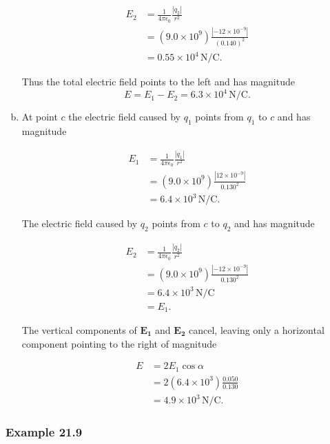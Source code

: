 \documentclass{article}
\begin{document}
\begin{enumerate}[a)]
        \begin{align*}
          E_2 & = \frac{1}{4\pi\epsilon_0} \frac{|q_2|}{r^2}               \\
              & = (9.0 \times 10^9) \frac{|-12 \times 10^{-9}|}{(0.140)^2} \\
              & = 0.55 \times 10^4\,\textrm{N}/\textrm{C}.
        \end{align*}

        Thus the total electric field points to the left and has magnitude \[E = E_1 - E_2 = 6.3 \times 10^4\,\textrm{N}/\textrm{C}.\]

  \item At point $c$ the electric field caused by $q_1$ points from $q_1$ to $c$ and has magnitude

        \begin{align*}
          E_1 & = \frac{1}{4\pi\epsilon_0} \frac{|q_1|}{r^2}            \\
              & = (9.0 \times 10^9) \frac{|12 \times 10^{-9}|}{0.130^2} \\
              & = 6.4 \times 10^3\,\textrm{N}/\textrm{C}.
        \end{align*}

        The electric field caused by $q_2$ points from $c$ to $q_2$ and has magnitude

        \begin{align*}
          E_2 & = \frac{1}{4\pi\epsilon_0} \frac{|q_2|}{r^2}             \\
              & = (9.0 \times 10^9) \frac{|-12 \times 10^{-9}|}{0.130^2} \\
              & = 6.4 \times 10^3\,\textrm{N}/\textrm{C}                 \\
              & = E_1.
        \end{align*}

        The vertical components of $\mathbf{E_1}$ and $\mathbf{E_2}$ cancel, leaving only a horizontal component pointing to the right of magnitude

        \begin{align*}
          E & = 2E_1\cos\alpha                          \\
            & = 2(6.4 \times 10^3)\frac{0.050}{0.130}   \\
            & = 4.9 \times 10^3\,\textrm{N}/\textrm{C}.
        \end{align*}
\end{enumerate}

\subsubsection{Example 21.9}
\end{document}
